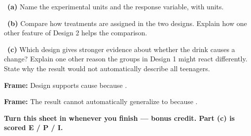 \documentclass[11pt]{article}
\begin{document}
~\textbf{(a)} Name the experimental units and the response variable, with units.\par
\workspace{0.8in}

~\textbf{(b)} Compare how treatments are assigned in the two designs. Explain how one other feature of Design 2 helps the comparison.\par
\workspace{1.4in}

~\textbf{(c)} Which design gives stronger evidence about whether the drink causes a change? Explain one other reason the groups in Design 1 might react differently. State why the result would not automatically describe all teenagers.\par
\workspace{2.0in}

\begin{sentenceframebox}\raggedright\textbf{Frame:} Design \blank[0.4in] supports cause because \blank[2.7in].\end{sentenceframebox}

\begin{sentenceframebox}\raggedright\textbf{Frame:} The result cannot automatically generalize to \blank[1.5in] because \blank[2in].\end{sentenceframebox}

\textbf{Turn this sheet in whenever you finish --- bonus credit. Part (c) is scored E / P / I.}\par
\end{document}
